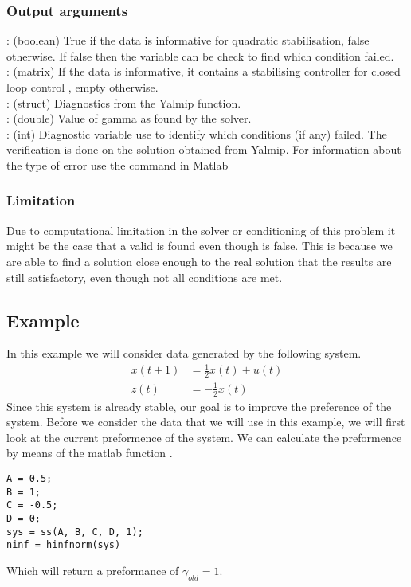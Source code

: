 \subsubsection*{Output arguments}
\textbf{}: (boolean) True if the data is informative for quadratic stabilisation, false otherwise. If false then the  variable can be check to find which condition failed. \\
\textbf{}: (matrix) If the data is informative, it contains a stabilising controller  for closed loop control , empty otherwise.\\
\textbf{}: (struct) Diagnostics from the Yalmip  function. \\
\textbf{}: (double) Value of gamma as found by the solver. \\
\textbf{}: (int) Diagnostic variable use to identify which conditions (if any) failed. The verification is done on the solution obtained from Yalmip. For information about the type of error use the  command in Matlab

\subsubsection*{Limitation}
Due to computational limitation in the solver or conditioning of this problem it might be the case that a valid  is found even though  is false. This is because we are able to find a solution close enough to the real solution that the results are still satisfactory, even though not all conditions are met. 

\subsection{Example}
In this example we will consider data generated by the following system.
\begin{align*}
	x(t+1) &= \frac{1}{2}x(t) + u(t) \\
	z(t)   &=  -\frac{1}{2}x(t)
\end{align*}
Since this system is already stable, our goal is to improve the preference of the system. Before we consider the data that we will use in this example, we will first look at the current preformence of the system. We can calculate the preformence by means of the matlab function .
\begin{lstlisting}
A = 0.5;
B = 1;
C = -0.5;
D = 0;
sys = ss(A, B, C, D, 1);
ninf = hinfnorm(sys)
\end{lstlisting}
Which will return a preformance of $\gamma_{old} = 1$.
 
